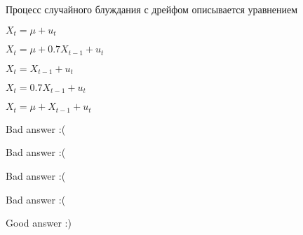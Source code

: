 
\begin{question}
Процесс случайного блуждания с дрейфом описывается уравнением
\begin{answerlist}
  \item \(X_t = \mu + u_t\)
  \item \(X_t = \mu + 0.7 X_{t-1} + u_t\)
  \item \(X_t = X_{t-1} + u_t\)
  \item \(X_t = 0.7 X_{t-1} + u_t\)
  \item \(X_t = \mu + X_{t-1} + u_t\)
\end{answerlist}
\end{question}

\begin{solution}
\begin{answerlist}
  \item Bad answer :(
  \item Bad answer :(
  \item Bad answer :(
  \item Bad answer :(
  \item Good answer :)
\end{answerlist}
\end{solution}


